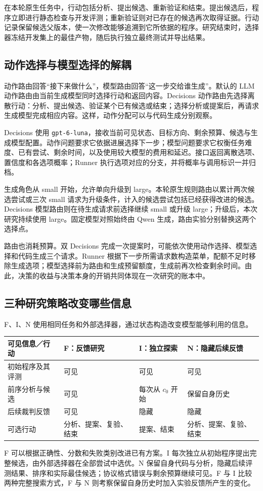 在本轮原生任务中，行动包括分析、提出候选、重新验证和结束。提出候选后，程序立即进行静态检查与开发评测；重新验证则对已存在的候选再次取得证据。行动记录保留候选父版本，使一次修改能够追溯到它所依据的程序。研究结束时，选择器冻结开发集上的最佳产物，随后执行独立最终测试并导出结果。

\subsection{动作选择与模型选择的解耦}
动作路由回答“接下来做什么”，模型路由回答“这一步交给谁生成”。默认的 LLM 动作路由由当前生成模型同时选择行动和返回内容。Decisions 动作路由先选择离散行动：分析、提出候选、验证某个已有候选或结束；选择分析或提案后，再请求生成模型完成相应内容。这样，动作分配可以与代码生成分别观察。

Decisions 使用 \texttt{gpt-6-luna}，接收当前可见状态、目标方向、剩余预算、候选与生成模型配置。动作问题要求它依据进展选择下一步；模型问题要求它权衡任务难度、已有尝试、剩余时间，以及使用较大模型的费用和延迟。接口返回离散选项、置信度和各选项概率；Runner 执行选项对应的分支，并将概率与调用标识一并归档。

生成角色从 small 开始，允许单向升级到 large。本轮原生规则路由以累计两次候选尝试或三次 small 请求为升级条件，计入的候选尝试包括已经获得改进的候选。Decisions 模型路由则在待生成请求前选择继续 small 或升级 large；升级后，本次研究持续使用 large。固定模型对照始终由 Qwen 生成，路由实验分别替换这两个选择点。

路由也消耗预算。双 Decisions 完成一次提案时，可能依次使用动作选择、模型选择和代码生成三个请求。Runner 根据下一步所需请求数构造菜单，配额不足时移除生成选项；模型选择前为路由和生成预留额度，生成前再次检查剩余时间。由此，决策的收益与决策本身的开销共同体现在一次研究的账本中。

\subsection{三种研究策略改变哪些信息}
F、I、N 使用相同任务和外部选择器，通过状态构造改变模型能够利用的信息。
\par\noindent
\begin{tabularx}{\linewidth}{@{}lXXX@{}}\toprule
可见信息／行动 & F：反馈研究 & I：独立探索 & N：隐藏后续反馈\\\midrule
初始程序及其评测 & 可见 & 可见 & 可见\\
前序分析与候选 & 可见 & 每次从 $c_0$ 开始 & 保留自身历史\\
后续裁判反馈 & 可见 & 隐藏 & 隐藏\\
可选行动 & 分析、提案、复验、结束 & 提案、结束 & 分析、提案、复验、结束\\\bottomrule
\end{tabularx}\par

F 可以根据正确性、分数和失败类别改进已有方案。I 每次独立从初始程序提出完整候选，由外部选择器在全部尝试中选优。N 保留自身代码与分析，隐藏后续评测结果、排序和实际最佳候选；协议格式错误与剩余预算继续可见。F 与 I 比较两种完整搜索方式，F 与 N 则考察保留自身历史时加入实验反馈所产生的变化。
